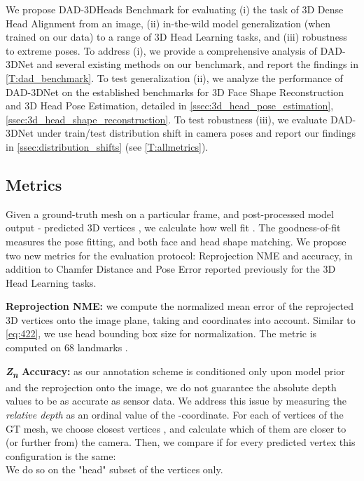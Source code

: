\documentclass[10pt,twocolumn,letterpaper]{article}
\begin{document}
We propose DAD-3DHeads Benchmark for evaluating (i) the task of 3D Dense Head Alignment from an image, (ii) in-the-wild model generalization (when trained on our data) to a range of 3D Head Learning tasks, and (iii) robustness to extreme poses. 
To address (i), we provide a comprehensive analysis of DAD-3DNet and several existing methods on our benchmark, and report the findings in \cref{T:dad_benchmark}. To test generalization (ii), we analyze the performance of DAD-3DNet on the established benchmarks for 3D Face Shape Reconstruction and 3D Head Pose Estimation, detailed in \cref{ssec:3d_head_pose_estimation}, \cref{ssec:3d_head_shape_reconstruction}.
To test robustness (iii), we evaluate DAD-3DNet under train/test distribution shift in camera poses and report our findings in \cref{ssec:distribution_shifts} (see \cref{T:allmetrics}).
\subsection{Metrics}\label{ssec:benchmark}
Given a ground-truth mesh  on a particular frame, and post-processed model output - predicted 3D vertices , we calculate how well  fit . 
The goodness-of-fit measures the pose fitting, and both face and head shape matching. We propose two new metrics for the evaluation protocol: Reprojection NME and  accuracy, in addition to Chamfer Distance and Pose Error reported previously for the 3D Head Learning tasks.

\textbf{Reprojection NME:} we compute the normalized mean error of the reprojected 3D vertices onto the image plane, taking  and  coordinates into account. Similar to \cref{eq:422}, we use head bounding box size for normalization. The metric is computed on 68 landmarks \cite{multipie}.



\textbf{\textit{Z\textsubscript{n}} Accuracy:}\label{ssec:zn} as our annotation scheme is conditioned only upon model prior and the reprojection onto the image, we do not guarantee the absolute depth values to be as accurate as sensor data.
We address this issue by measuring the \emph{relative depth} as an ordinal value of the -coordinate. 
For each of  vertices  of the GT mesh, we choose  closest vertices  , and calculate which of them are closer to (or further from) the camera. Then, we compare if for every predicted vertex  this configuration is the same:\\

We do so on the "head" subset of the vertices only.
\end{document}
